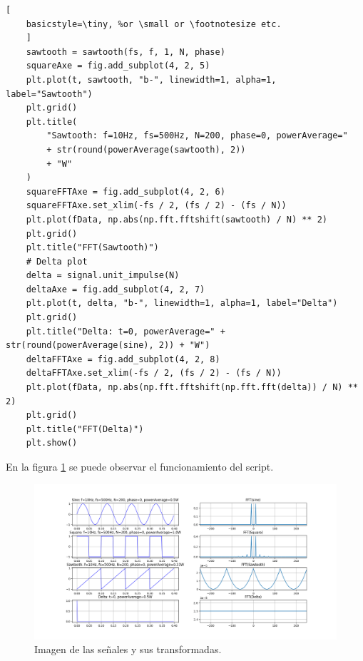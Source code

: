 \documentclass[
    11pt,
    spanish,
	a4paper
]{article}
\begin{document}
\begin{lstlisting}[
    basicstyle=\tiny, %or \small or \footnotesize etc.
    ]
    sawtooth = sawtooth(fs, f, 1, N, phase)
    squareAxe = fig.add_subplot(4, 2, 5)
    plt.plot(t, sawtooth, "b-", linewidth=1, alpha=1, label="Sawtooth")
    plt.grid()
    plt.title(
        "Sawtooth: f=10Hz, fs=500Hz, N=200, phase=0, powerAverage="
        + str(round(powerAverage(sawtooth), 2))
        + "W"
    )
    squareFFTAxe = fig.add_subplot(4, 2, 6)
    squareFFTAxe.set_xlim(-fs / 2, (fs / 2) - (fs / N))
    plt.plot(fData, np.abs(np.fft.fftshift(sawtooth) / N) ** 2)
    plt.grid()
    plt.title("FFT(Sawtooth)")
    # Delta plot
    delta = signal.unit_impulse(N)
    deltaAxe = fig.add_subplot(4, 2, 7)
    plt.plot(t, delta, "b-", linewidth=1, alpha=1, label="Delta")
    plt.grid()
    plt.title("Delta: t=0, powerAverage=" + str(round(powerAverage(sine), 2)) + "W")
    deltaFFTAxe = fig.add_subplot(4, 2, 8)
    deltaFFTAxe.set_xlim(-fs / 2, (fs / 2) - (fs / N))
    plt.plot(fData, np.abs(np.fft.fftshift(np.fft.fft(delta)) / N) ** 2)
    plt.grid()
    plt.title("FFT(Delta)")
    plt.show()
\end{lstlisting}

En la figura \ref{fig:parte1} se puede observar el funcionamiento del script.

\begin{figure}[htbp]
	\centering
	\includegraphics[width=\textwidth]{img/parte1.png}
	\caption{Imagen de las señales y sus transformadas.}
	\label{fig:parte1}
\end{figure}
\end{document}
